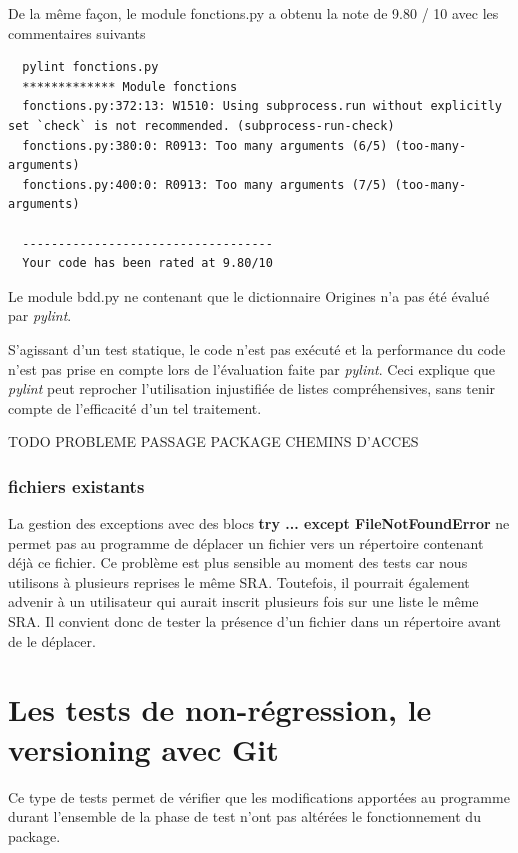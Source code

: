 \documentclass[twoside,a4paper,11pt,frenchb,openany]{report}
\begin{document}
De la même façon, le module fonctions.py a obtenu la note de 9.80 / 10 avec les commentaires suivants

\begin{verbatim}  pylint fonctions.py
  ************* Module fonctions
  fonctions.py:372:13: W1510: Using subprocess.run without explicitly set `check` is not recommended. (subprocess-run-check)
  fonctions.py:380:0: R0913: Too many arguments (6/5) (too-many-arguments)
  fonctions.py:400:0: R0913: Too many arguments (7/5) (too-many-arguments)

  -----------------------------------
  Your code has been rated at 9.80/10\end{verbatim}

Le module bdd.py ne contenant que le dictionnaire Origines n'a pas été évalué par \textit{pylint}.

S'agissant d'un test statique, le code n'est pas exécuté et la performance du code n'est pas prise en compte lors de l'évaluation faite par \textit{pylint}. Ceci explique que \textit{pylint} peut reprocher l'utilisation injustifiée de listes compréhensives, sans tenir compte de l'efficacité d'un tel traitement.

TODO PROBLEME PASSAGE PACKAGE
CHEMINS D'ACCES

\subsubsection{fichiers existants}

La gestion des exceptions avec des blocs \textbf{try ... except FileNotFoundError} ne permet pas au programme de déplacer un fichier vers un répertoire contenant déjà ce fichier. Ce problème est plus sensible au moment des tests car nous utilisons à plusieurs reprises le même SRA. Toutefois, il pourrait également advenir à un utilisateur qui aurait inscrit plusieurs fois sur une liste le même SRA. Il convient donc de tester la présence d'un fichier dans un répertoire avant de le déplacer.





\section{Les tests de non-régression, le versioning avec Git}

Ce type de tests permet de vérifier que les modifications apportées au programme durant l'ensemble de la phase de test n'ont pas altérées le fonctionnement du package.
\end{document}
